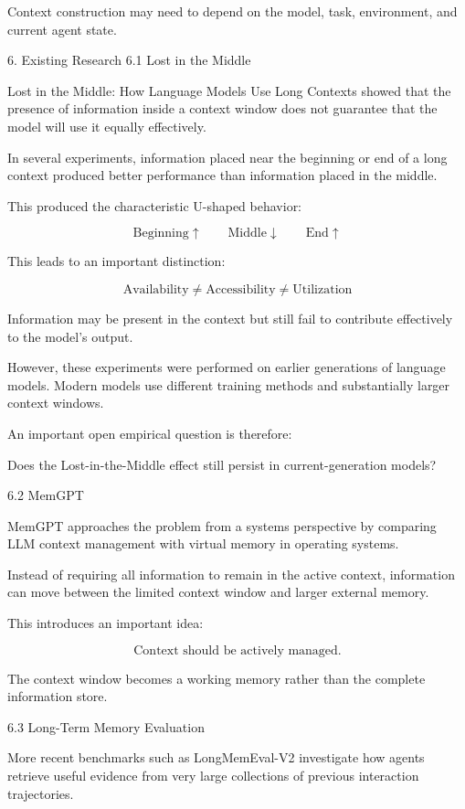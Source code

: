 Context construction may need to depend on the model, task, environment, and current agent state.

6. Existing Research
6.1 Lost in the Middle

Lost in the Middle: How Language Models Use Long Contexts showed that the presence of information inside a context window does not guarantee that the model will use it equally effectively.

In several experiments, information placed near the beginning or end of a long context produced better performance than information placed in the middle.

This produced the characteristic U-shaped behavior:

$$ \text{Beginning} \uparrow \qquad \text{Middle} \downarrow \qquad \text{End} \uparrow $$

This leads to an important distinction:

$$ \boxed{ \text{Availability} \neq \text{Accessibility} \neq \text{Utilization} } $$

Information may be present in the context but still fail to contribute effectively to the model's output.

However, these experiments were performed on earlier generations of language models. Modern models use different training methods and substantially larger context windows.

An important open empirical question is therefore:

Does the Lost-in-the-Middle effect still persist in current-generation models?

6.2 MemGPT

MemGPT approaches the problem from a systems perspective by comparing LLM context management with virtual memory in operating systems.

Instead of requiring all information to remain in the active context, information can move between the limited context window and larger external memory.

This introduces an important idea:

$$ \boxed{ \text{Context should be actively managed.} } $$

The context window becomes a working memory rather than the complete information store.

6.3 Long-Term Memory Evaluation

More recent benchmarks such as LongMemEval-V2 investigate how agents retrieve useful evidence from very large collections of previous interaction trajectories.

